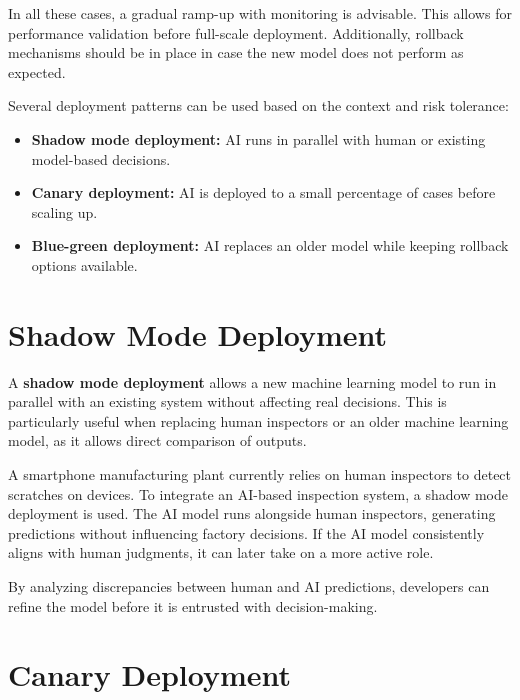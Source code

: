 \documentclass[12pt,openany]{book}
\begin{document}
In all these cases, a gradual ramp-up with monitoring is advisable. This allows for performance validation before full-scale deployment. Additionally, rollback mechanisms should be in place in case the new model does not perform as expected. \newline

Several deployment patterns can be used based on the context and risk tolerance:

\begin{itemize}
    \item \textbf{Shadow mode deployment:} AI runs in parallel with human or existing model-based decisions.
    \item \textbf{Canary deployment:} AI is deployed to a small percentage of cases before scaling up.
    \item \textbf{Blue-green deployment:} AI replaces an older model while keeping rollback options available.
\end{itemize}



\section{Shadow Mode Deployment}

A \textbf{shadow mode deployment} allows a new machine learning model to run in parallel with an existing system without affecting real decisions. This is particularly useful when replacing human inspectors or an older machine learning model, as it allows direct comparison of outputs.

\begin{examplebox}
   A smartphone manufacturing plant currently relies on human inspectors to detect scratches on devices. To integrate an AI-based inspection system, a shadow mode deployment is used. The AI model runs alongside human inspectors, generating predictions without influencing factory decisions. If the AI model consistently aligns with human judgments, it can later take on a more active role.
\end{examplebox}

By analyzing discrepancies between human and AI predictions, developers can refine the model before it is entrusted with decision-making.



\section{Canary Deployment}
\end{document}
